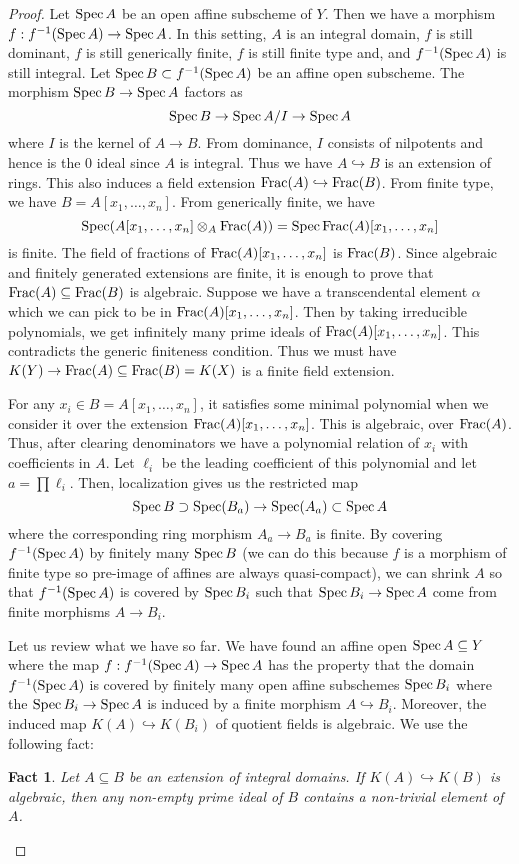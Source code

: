 \documentclass[]{pcmi}
\theoremstyle{plain}
\newtheorem{Fact}[equation]{Fact}
\theoremstyle{definition}
\theoremstyle{remark}
\begin{document}
\begin{proof}
    Let $\operatorname{Spec} A$ be an open affine subscheme of $Y$. Then we have a morphism $f : f^{-1} (\operatorname{Spec} A) \to \operatorname{Spec} A$. In this setting, $A$ is an integral domain, $f$ is still dominant, $f$ is still generically finite, $f$ is still finite type and, and $f^{-1}(\operatorname{Spec} A)$ is still integral. Let $\operatorname{Spec} B \subset f^{-1}(\operatorname{Spec} A)$ be an affine open subscheme. The morphism $\operatorname{Spec} B \to \operatorname{Spec} A$ factors as 
    \[
        \operatorname{Spec} B \to \operatorname{Spec} A/I \to \operatorname{Spec} A
    \]
    where $I$ is the kernel of $A \to B$. From dominance, $I$ consists of nilpotents and hence is the $0$ ideal since $A$ is integral. Thus we have $A \hookrightarrow B$ is an extension of rings. This also induces a field extension $\operatorname{Frac}(A) \hookrightarrow \operatorname{Frac} (B)$. From finite type, we have $B = A[x_1, \ldots, x_n]$. From generically finite, we have 
    \[
        \operatorname{Spec} (A[x_1, \ldots, x_n] \otimes_A \operatorname{Frac}(A)) = \operatorname{Spec} \operatorname{Frac}(A)[x_1, \ldots, x_n]
    \]
    is finite. The field of fractions of $\operatorname{Frac}(A)[x_1, \ldots, x_n]$ is $\operatorname{Frac}(B)$. Since algebraic and finitely generated extensions are finite, it is enough to prove that $\operatorname{Frac}(A) \subseteq \operatorname{Frac}(B)$ is algebraic. Suppose we have a transcendental element $\alpha$ which we can pick to be in $\operatorname{Frac}(A)[x_1, \ldots, x_n]$. Then by taking irreducible polynomials, we get infinitely many prime ideals of $\operatorname{Frac}(A)[x_1, \ldots, x_n]$. This contradicts the generic finiteness condition. Thus we must have $K(Y) \to \operatorname{Frac}(A) \subseteq \operatorname{Frac}(B) = K(X)$ is a finite field extension. 

    For any $x_i \in B = A[x_1, \ldots, x_n]$, it satisfies some minimal polynomial when we consider it over the extension $\operatorname{Frac}(A)[x_1, \ldots, x_n]$. This is algebraic, over $\operatorname{Frac}(A)$. Thus, after clearing denominators we have a polynomial relation of $x_i$ with coefficients in $A$. Let $\ell_i$ be the leading coefficient of this polynomial and let $a = \prod \ell_i$. Then, localization gives us the restricted map
    \[
        \operatorname{Spec} B \supset \operatorname{Spec} (B_a) \to \operatorname{Spec} (A_a) \subset \operatorname{Spec} A 
    \]
    where the corresponding ring morphism $A_a \to B_a$ is finite. By covering $f^{-1}(\operatorname{Spec} A)$ by finitely many $\operatorname{Spec} B$ (we can do this because $f$ is a morphism of finite type so pre-image of affines are always quasi-compact), we can shrink $A$ so that $f^{-1}(\operatorname{Spec} A)$ is covered by $\operatorname{Spec} B_i$ such that $\operatorname{Spec} B_i \to \operatorname{Spec} A$ come from finite morphisms $A \to B_i$. 
    
    Let us review what we have so far. We have found an affine open $\operatorname{Spec} A \subseteq Y$ where the map $f : f^{-1}(\operatorname{Spec} A) \to \operatorname{Spec} A$ has the property that the domain $f^{-1}(\operatorname{Spec} A)$ is covered by finitely many open affine subschemes $\operatorname{Spec} B_i$ where the $\operatorname{Spec} B_i \to \operatorname{Spec} A$ is induced by a finite morphism $A \hookrightarrow B_i$. Moreover, the induced map $K(A) \hookrightarrow K(B_i)$ of quotient fields is algebraic. We use the following fact: 
    \begin{Fact}
        Let $A \subseteq B$ be an extension of integral domains. If $K(A) \hookrightarrow K(B)$ is algebraic, then any non-empty prime ideal of $B$ contains a non-trivial element of $A$. 
    \end{Fact}


\end{proof}
\end{document}
